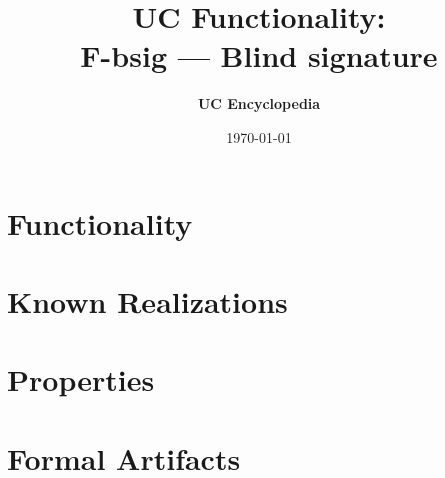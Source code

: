 \documentclass[11pt,a4paper]{article}
\title{\textbf{\Large UC Functionality:}\\[0.2em] \Large F-bsig --- Blind signature}
\author{\textbf{UC Encyclopedia}}
\date{\today}
\newtheorem{functionality}{Functionality}
\begin{document}
\maketitle

\begin{abstract}
\end{abstract}

\section{Functionality}

%

\section{Known Realizations}


\section{Properties}


\section{Formal Artifacts}

\end{document}
